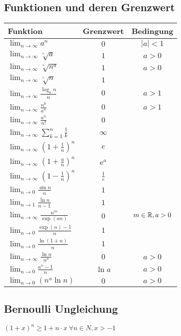 \subsection{Funktionen und deren Grenzwert}
\begin{tabular}{l | c | c}
    Funktion & Grenzwert & Bedingung\\\hline
    $\lim_{n \to \infty} a^n$ & $0$ & $|a| < 1$\\\hline
    $\lim_{n \to \infty} \sqrt[^n]{a}$ & $1$ & $a > 0$\\\hline
    $\lim_{n \to \infty} \sqrt[^n]{n^a}$ & $1$ & $a > 0$\\\hline
    $\lim_{n \to \infty} \sqrt[^n]{n}$ & $1$\\\hline
    $\lim_{n \to \infty} \frac{\log_an}{n}$ & $0$ & $a > 1$\\\hline
    $\lim_{n \to \infty} \frac{n^k}{a^n}$ & $0$ & $a > 1$\\\hline
    $\lim_{n \to \infty} \frac{a^n}{n!}$ & $0$\\\hline
    $\lim_{n \to \infty} \sum_{k=1}^{n} \frac{1}{k}$ & $\infty$\\\hline
    $\lim_{n \to \infty} \left( 1 + \frac{1}{n} \right)^n$ & $e$\\\hline
    $\lim_{n \to \infty} \left( 1 + \frac{a}{n} \right)^n$ &e$^a$\\\hline
    $\lim_{n \to \infty} \left( 1 - \frac{1}{n} \right)^n$ & $\frac{1}{e}$\\\hline
    $\lim_{n \to 0} \frac{\sin n}{n}$ & $1$\\\hline
    $\lim_{n \to 1} \frac{\ln n}{n - 1}$ & $1$\\\hline
    $\lim_{n \to \infty} \frac{n^m}{\exp(an)}$ & $0$ & $m \in \mathbb{R}, a > 0$\\\hline
    $\lim_{n \to 0} \frac{\exp(n) - 1}{n}$ & $1$\\\hline
    $\lim_{n \to 0} \frac{\ln(1 + n)}{n}$ & $1$\\\hline
    $\lim_{n \to \infty} \frac{\ln n}{n^a}$ & $0$ & $a > 0$\\\hline
    $\lim_{n \to 0} \frac{a^n - 1}{n}$ & $\ln a$ & $a > 0$\\\hline
    $\lim_{n \to 0} (n^a \ln n)$ & $0$ & $a > 0$\\\hline
\end{tabular}

\subsection{Bernoulli Ungleichung}
$\left( 1 + x \right)^{n} \ge  1 + n \cdot x \ \forall n \in N, x > -1 $

